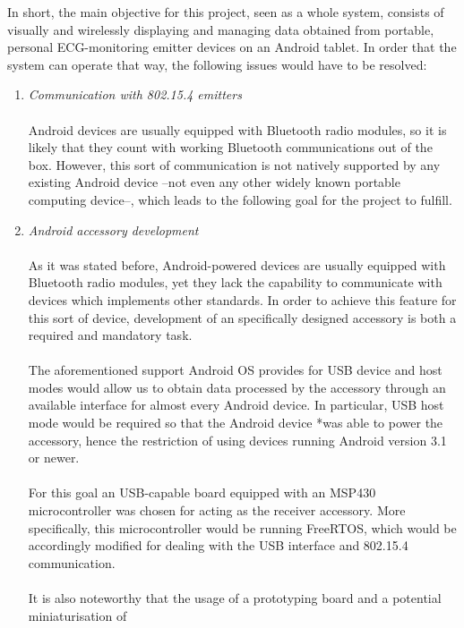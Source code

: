 		In short, the main objective for this project, seen as a whole system, consists of
		visually and wirelessly displaying and managing data obtained from portable, personal ECG-monitoring
		emitter devices on an Android tablet. In order that the system can operate that way, the following 
		issues would have to be resolved:
		\begin{enumerate}
			\item \emph{Communication with 802.15.4 emitters}\\\\
				Android devices are usually equipped with Bluetooth radio modules, so it is likely that they 
				count with working Bluetooth communications out of the box.
				However, this sort of communication is not natively supported by any existing Android device
				--not even any other widely known portable computing device--, which leads to the following goal
				for the project to fulfill.\\
			\item \emph{Android accessory development}\\\\
				As it was stated before, Android-powered devices are usually equipped with Bluetooth radio
				modules, yet they lack the capability to communicate with devices which implements other 
				standards. In order to achieve this feature for this sort of device, development of an
				specifically designed accessory is both a required and mandatory task.\\\\
				The aforementioned support Android OS provides for USB device and host modes would allow us to
				obtain data processed by the accessory through an available interface for almost every 
				Android device. In particular, USB host mode would be required so that the Android device 
				*was able to power the accessory, hence the restriction of using devices running %
				Android version 3.1 or newer.\\\\
				For this goal an USB-capable board equipped with an MSP430 microcontroller was chosen for acting
				as the receiver accessory. More specifically, this microcontroller would be running FreeRTOS,
				which would be accordingly modified for dealing with the USB interface and 802.15.4 
				communication.\\\\
				It is also noteworthy that the usage of a prototyping board and a potential miniaturisation of

\end{enumerate}
